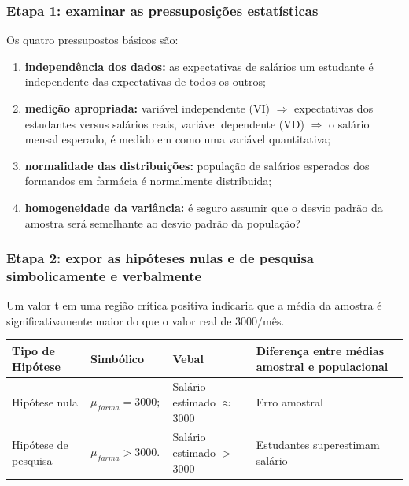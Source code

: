 \documentclass[11pt]{beamer}
\begin{document}
\begin{frame}
\frametitle{Etapa 1: examinar as pressuposições estatísticas}

Os quatro pressupostos básicos são:

\begin{enumerate}
\item \textbf{independência dos dados:} as expectativas de salários um estudante é independente das expectativas de todos os outros;
\item \textbf{medição apropriada:} variável independente (VI) \(\Rightarrow\) expectativas dos estudantes versus salários reais, variável dependente (VD) \(\Rightarrow\) o salário mensal esperado, é medido em como uma variável quantitativa;
\item \textbf{normalidade das distribuições:} população de salários esperados dos formandos em farmácia é normalmente distribuida;
\item \textbf{homogeneidade da variância:} é seguro assumir que o desvio padrão da amostra será semelhante ao desvio padrão da população?
\end{enumerate}

\end{frame}

\begin{frame}
\frametitle{Etapa 2: expor as hipóteses nulas e de pesquisa simbolicamente e verbalmente}

Um valor t em uma região crítica positiva indicaria que a média da amostra é significativamente maior do que o valor real de 3000/mês.

\begin{center}
\begin{tabular}{ m{2cm}|m{2cm}|m{3cm}|m{3cm} } 
 \hline
 Tipo de Hipótese & Simbólico & Vebal & Diferença entre médias amostral e populacional\\
  \hline
 Hipótese nula & $\mu_{farma}=3000;$ & Salário estimado $\approx$ 3000 & Erro amostral \\ 
 Hipótese de pesquisa & $\mu_{farma}>3000.$ & Salário estimado $>$ 3000 & Estudantes superestimam salário  \\ 
 \hline
 \hline
\end{tabular}
\end{center}

\end{frame}
\end{document}

